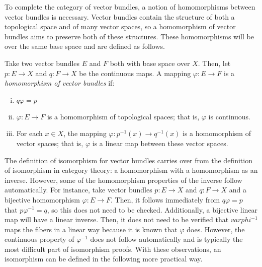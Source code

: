 \documentclass[../sean_thesis.tex]{subfiles}
\begin{document}
\begin{example}
\end{example}


To complete the category of vector bundles, a notion of homomorphisms between vector bundles is necessary. Vector bundles contain the structure of both a topological space and of many vector spaces, so a homomorphism of vector bundles aims to preserve both of these structures. These homomorphisms will be over the same base space and are defined as follows.

\begin{definition}
	Take two vector bundles $E$ and $F$ both with base space over $X$. Then, let $p: E \to X$ and $q: F \to X$ be the continuous maps. A mapping $\varphi: E \to F$ is a \emph{homomorphism of vector bundles} if:
\vspace{-\varparskip}
	\begin{enumerate}[(i)]
		\item $q \varphi = p$
		\item $\varphi: E \to F$ is a homomorphism of topological spaces; that is, $\varphi$ is continuous.
		\item For each $x \in X$, the mapping $\varphi: p^{-1}(x) \to q^{-1}(x)$ is a homomorphism of vector spaces; that is, $\varphi$ is a linear map between these vector spaces.
	\end{enumerate}
\end{definition}


The definition of isomorphism for vector bundles carries over from the definition of isomorphism in category theory: a homomorphism with a homomorphism as an inverse. However, some of the homomorphism properties of the inverse follow automatically. For instance, take vector bundles $p: E \to X$ and $q: F \to X$ and a bijective homomorphism $\varphi: E \to F$. Then, it follows immediately from $q\varphi = p$ that $p \varphi^{-1} = q$, so this does not need to be checked. Additionally, a bijective linear map will have a linear inverse. Then, it does not need to be verified that $varphi^{-1}$ maps the fibers in a linear way because it is known that $\varphi$ does. However, the continuous property of $\varphi^{-1}$ does not follow automatically and is typically the most difficult part of isomorphism proofs. With these observations, an isomorphism can be defined in the following more practical way.
\end{document}
